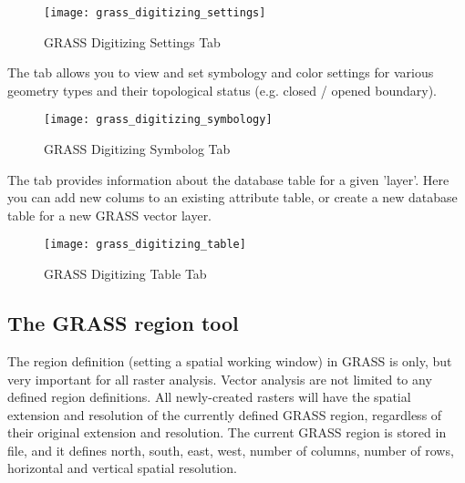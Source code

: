 \begin{figure}[h]
 \begin{center}
 \caption{GRASS Digitizing Settings Tab \nixcaption}\label{fig:grass_digitizing_settings}
 \texttt{[image: grass\_digitizing\_settings]}
 \end{center}
\end{figure}


The  tab allows you to view and set symbology and color
settings for various geometry types and their topological status (e.g. closed
/ opened boundary).

\begin{figure}[h]
 \begin{center}
 \caption{GRASS Digitizing Symbolog Tab \nixcaption}\label{fig:grass_digitizing_symbology}
 \texttt{[image: grass\_digitizing\_symbology]}
 \end{center}
\end{figure}

 

The  tab provides information about the database table for
a given 'layer'. Here you can add new colums to an existing attribute table,
or create a new database table for a new GRASS vector layer.

\begin{figure}[h]
 \begin{center}
 \caption{GRASS Digitizing Table Tab \nixcaption}\label{fig:grass_digitizing_table}
 \texttt{[image: grass\_digitizing\_table]}
 \end{center}
\end{figure}

\begin{Tip}\caption{\textsc{GRASS Edit Permissions}}
\end{Tip} 

\subsection{The GRASS region tool}

The region definition (setting a spatial working window) in GRASS is only,
but very important for all raster analysis. Vector analysis are not limited
to any defined region definitions. All newly-created rasters will have the
spatial extension and resolution of the currently defined GRASS region,
regardless of their original extension and resolution. The current GRASS
region is stored in  file, and it defines
north, south, east, west, number of columns, number of rows, horizontal and
vertical spatial resolution.

